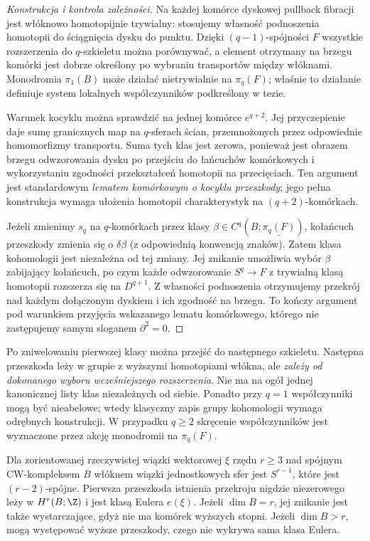\begin{proof}[Konstrukcja i kontrola zależności]
Na każdej komórce dyskowej pullback fibracji jest
włóknowo homotopijnie trywialny: stosujemy własność
podnoszenia homotopii do ściągnięcia dysku do punktu.
Dzięki $(q-1)$-spójności $F$ wszystkie rozszerzenia do
$q$-szkieletu można porównywać, a element otrzymany na
brzegu komórki jest dobrze określony po wybraniu transportów
między włóknami. Monodromia $\pi_1(B)$ może działać
nietrywialnie na $\pi_q(F)$; właśnie to działanie definiuje
system lokalnych współczynników podkreślony w tezie.

Warunek kocyklu można sprawdzić na jednej komórce
$e^{q+2}$. Jej przyczepienie daje sumę granicznych map na
$q$-sferach ścian, przemnożonych przez odpowiednie
homomorfizmy transportu. Suma tych klas jest zerowa,
ponieważ jest obrazem brzegu odwzorowania dysku po przejściu do
łańcuchów komórkowych i wykorzystaniu zgodności
przekształceń homotopii na przecięciach. Ten argument
jest standardowym \emph{lematem komórkowym o kocyklu
przeszkody}; jego pełna konstrukcja wymaga ułożenia
homotopii charakterystyk na $(q+2)$-komórkach.

Jeżeli zmienimy $s_q$ na $q$-komórkach przez klasy
$\beta\in C^q(B;\underline{\pi_q(F)})$, kołańcuch
przeszkody zmienia się o $\delta\beta$ (z odpowiednią
konwencją znaków). Zatem klasa kohomologii jest
niezależna od tej zmiany. Jej znikanie umożliwia wybór
$\beta$ zabijający kołańcuch, po czym każde odwzorowanie
$S^q\to F$ z trywialną klasą homotopii rozszerza się
na $D^{q+1}$. Z własności podnoszenia otrzymujemy
przekrój nad każdym dołączonym dyskiem i ich zgodność
na brzegu. To kończy argument pod warunkiem przyjęcia
wskazanego lematu komórkowego, którego nie zastępujemy
samym sloganem $\partial^2=0$.
\end{proof}
\begin{uwaga}
Po zniwelowaniu pierwszej klasy można przejść do następnego
szkieletu. Następna przeszkoda leży w grupie z wyższymi
homotopiami włókna, ale \emph{zależy od dokonanego wyboru
wcześniejszego rozszerzenia}. Nie ma na ogół jednej
kanonicznej listy klas niezależnych od siebie.
Ponadto przy $q=1$ współczynniki mogą być nieabelowe;
wtedy klasyczny zapis grupy kohomologii wymaga odrębnych
konstrukcji. W przypadku $q\ge2$ skręcenie współczynników
jest wyznaczone przez akcję monodromii na $\pi_q(F)$.
\end{uwaga}
\begin{przyklad}
Dla zorientowanej rzeczywistej wiązki wektorowej $\xi$ rzędu
$r\ge3$ nad spójnym CW-kompleksem $B$ włóknem wiązki
jednostkowych sfer jest $S^{r-1}$, które jest $(r-2)$-spójne.
Pierwsza przeszkoda istnienia przekroju nigdzie niezerowego
leży w $H^r(B;\Z)$ i jest klasą Eulera $e(\xi)$.
Jeżeli $\dim B=r$, jej znikanie jest także wystarczające,
gdyż nie ma komórek wyższych stopni. Jeżeli
$\dim B>r$, mogą występować wyższe przeszkody, czego
nie wykrywa sama klasa Eulera.
\end{przyklad}
